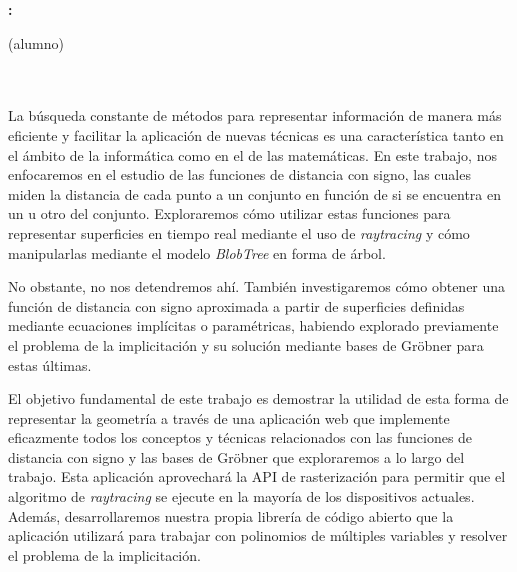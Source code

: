 \thispagestyle{empty}

\begin{center}
{\large\bfseries \miTitulo: \miSubtitulo}\\
\end{center}
\begin{center}
\miNombre (alumno)\\
\end{center}

\\

\vspace{0.7cm}
\\

La búsqueda constante de métodos para representar información de manera más eficiente y facilitar la aplicación de nuevas técnicas es una característica tanto en el ámbito de la informática como en el de las matemáticas. En este trabajo, nos enfocaremos en el estudio de las funciones de distancia con signo, las cuales miden la distancia de cada punto a un conjunto en función de si se encuentra en un  u otro del conjunto. Exploraremos cómo utilizar estas funciones para representar superficies en tiempo real mediante el uso de \textit{raytracing} y cómo manipularlas mediante el modelo \textit{BlobTree} en forma de árbol.\newline

No obstante, no nos detendremos ahí. También investigaremos cómo obtener una función de distancia con signo aproximada a partir de superficies definidas mediante ecuaciones implícitas o paramétricas, habiendo explorado previamente el problema de la implicitación y su solución mediante bases de Gröbner para estas últimas.\newline

El objetivo fundamental de este trabajo es demostrar la utilidad de esta forma de representar la geometría a través de una aplicación web que implemente eficazmente todos los conceptos y técnicas relacionados con las funciones de distancia con signo y las bases de Gröbner que exploraremos a lo largo del trabajo. Esta aplicación aprovechará la API de rasterización para permitir que el algoritmo de \textit{raytracing} se ejecute en la mayoría de los dispositivos actuales. Además, desarrollaremos nuestra propia librería de código abierto que la aplicación utilizará para trabajar con polinomios de múltiples variables y resolver el problema de la implicitación.
\cleardoublepage


